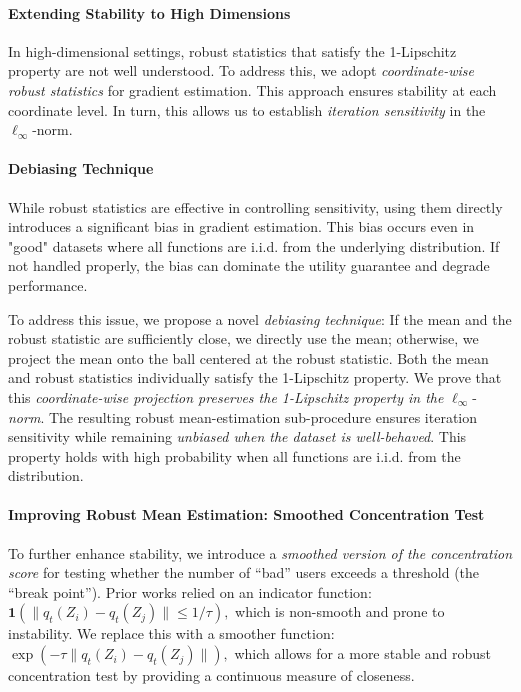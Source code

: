 \paragraph{Extending Stability to High Dimensions}  
In high-dimensional settings, robust statistics that satisfy the 1-Lipschitz property are not well understood. To address this, we adopt \textit{coordinate-wise robust statistics} for gradient estimation. This approach ensures stability at each coordinate level. In turn, this allows us to establish \textit{iteration sensitivity} in the $\ell_\infty$-norm.

\paragraph{Debiasing Technique}  
While robust statistics are effective in controlling sensitivity, using them directly introduces a significant bias in gradient estimation. This bias occurs even in "good" datasets where all functions are i.i.d. from the underlying distribution. If not handled properly, the bias can dominate the utility guarantee and degrade performance.

To address this issue, we propose a novel \textit{debiasing technique}: If the mean and the robust statistic are sufficiently close, we directly use the mean; otherwise, we project the mean onto the ball centered at the robust statistic.  
Both the mean and robust statistics individually satisfy the 1-Lipschitz property. We prove that this \textit{coordinate-wise projection preserves the 1-Lipschitz property in the} $\ell_\infty$-\textit{norm}. The resulting robust mean-estimation sub-procedure ensures iteration sensitivity while remaining \textit{unbiased when the dataset is well-behaved}. This property holds with high probability when all functions are i.i.d. from the distribution.

\paragraph{Improving Robust Mean Estimation: Smoothed Concentration Test}  
To further enhance stability, we introduce a \textit{smoothed version of the concentration score} for testing whether the number of ``bad'' users exceeds a threshold (the ``break point''). Prior works relied on an indicator function:  
$ 
\mathbf{1}(\|q_t(Z_i) - q_t(Z_j)\| \leq 1/\tau),
$ 
which is non-smooth and prone to instability. We replace this with a smoother function:  
$
\exp\left(-\tau \|q_t(Z_i) - q_t(Z_j)\|\right),  
$  which allows for a more stable and robust concentration test by providing a continuous measure of closeness.

